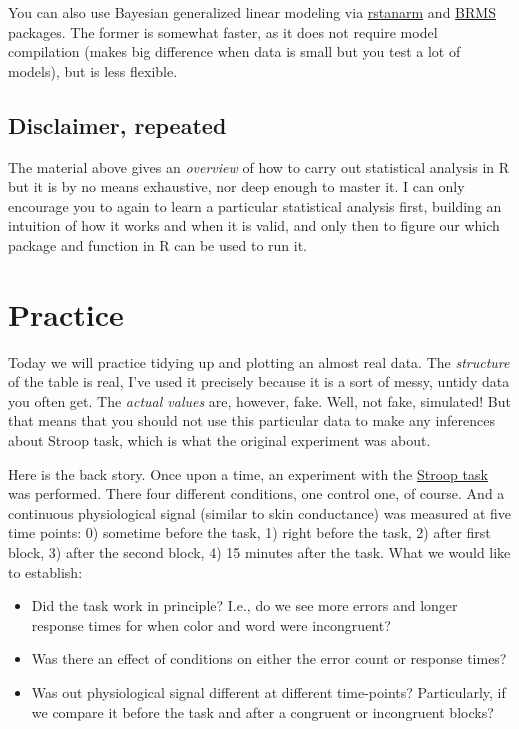 \documentclass[
]{book}
\providecommand{\tightlist}{%
  \setlength{\itemsep}{0pt}\setlength{\parskip}{0pt}}
\begin{document}
You can also use Bayesian generalized linear modeling via \href{https://mc-stan.org/rstanarm/}{rstanarm} and \href{https://github.com/paul-buerkner/brms}{BRMS} packages. The former is somewhat faster, as it does not require model compilation (makes big difference when data is small but you test a lot of models), but is less flexible.

\hypertarget{disclaimer-repeated}{%
\section{Disclaimer, repeated}\label{disclaimer-repeated}}

The material above gives an \emph{overview} of how to carry out statistical analysis in R but it is by no means exhaustive, nor deep enough to master it. I can only encourage you to again to learn a particular statistical analysis first, building an intuition of how it works and when it is valid, and only then to figure our which package and function in R can be used to run it.

\hypertarget{practice}{%
\chapter{Practice}\label{practice}}

Today we will practice tidying up and plotting an almost real data. The \emph{structure} of the table is real, I've used it precisely because it is a sort of messy, untidy data you often get. The \emph{actual values} are, however, fake. Well, not fake, simulated! But that means that you should not use this particular data to make any inferences about Stroop task, which is what the original experiment was about.

Here is the back story. Once upon a time, an experiment with the \href{https://en.wikipedia.org/wiki/Stroop_effect}{Stroop task} was performed. There four different conditions, one control one, of course. And a continuous physiological signal (similar to skin conductance) was measured at five time points: 0) sometime before the task, 1) right before the task, 2) after first block, 3) after the second block, 4) 15 minutes after the task. What we would like to establish:

\begin{itemize}
\tightlist
\item
  Did the task work in principle? I.e., do we see more errors and longer response times for when color and word were incongruent?
\item
  Was there an effect of conditions on either the error count or response times?
\item
  Was out physiological signal different at different time-points? Particularly, if we compare it before the task and after a congruent or incongruent blocks?
\end{itemize}
\end{document}
